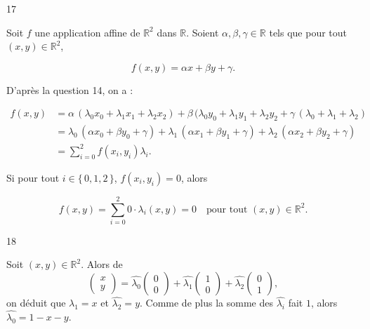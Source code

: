 \begin{reponse}{17}

Soit $f$ une application affine de $\mathbb{R}^2$ dans $\mathbb{R}$. Soient $\alpha, \beta,\gamma \in \mathbb{R}$ tels que pour tout $(x,y) \in \mathbb{R}^2$, 

\[
    f(x,y) = \alpha x + \beta y + \gamma.
\]

D'après la question 14, on a :

\begin{align*}  
    f(x,y) & = \alpha \, (\lambda_0x_0 + \lambda_1x_1+\lambda_2x_2) + \beta \, (\lambda_0y_0 + \lambda_1y_1+\lambda_2y_2 + \gamma \, (\lambda_0+\lambda_1+\lambda_2) \\
    & = \lambda_0 \, (\alpha x_0 + \beta y_0 + \gamma) + \lambda_1 \, (\alpha x_1 + \beta y_1 + \gamma) + \lambda_2 \, (\alpha x_2 + \beta y_2 + \gamma) \\
    & = \sum_{i=0}^2 f(x_i,y_i) \lambda_i.
\end{align*}

Si pour tout $i \in \{ \, 0,1,2 \, \}$, $f(x_i,y_i)=0$, alors

\[ 
    f(x,y) = \sum_{i=0}^2 0 \cdot \lambda_i(x,y) = 0 \quad \text{pour tout } (x,y) \in \mathbb{R}^2.
\]
\end{reponse}


\begin{reponse}{18}

\begin{center}
\end{center}

Soit $(x,y) \in \mathbb{R}^2$. Alors de $$\begin{pmatrix}
    x \\
    y
\end{pmatrix} = \hat{\lambda_0} \begin{pmatrix}
    0\\0
\end{pmatrix} + \hat{\lambda_1}\begin{pmatrix}
    1\\0
\end{pmatrix} + \hat{\lambda_2}\begin{pmatrix}
    0\\1
\end{pmatrix},$$ on déduit que $\hat{\lambda_1}=x$ et $\hat{\lambda_2}=y$. Comme de plus la somme des $\hat{\lambda_i}$ fait $1$, alors $\hat{\lambda_0} = 1-x-y$.
\end{reponse}

